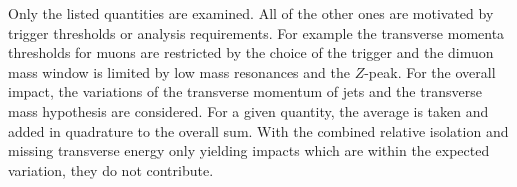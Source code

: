  
Only the listed quantities are examined. All of the other ones are motivated by trigger thresholds or analysis requirements. For example the transverse momenta thresholds for muons are restricted by the choice of the trigger and the dimuon mass window is limited by low mass resonances and the $Z$-peak. For the overall impact, the variations of the transverse momentum of jets and the transverse mass hypothesis are considered. For a given quantity, the average is taken and added in quadrature to the overall sum. With the combined relative isolation and missing transverse energy only yielding impacts which are within the expected variation, they do not contribute.


